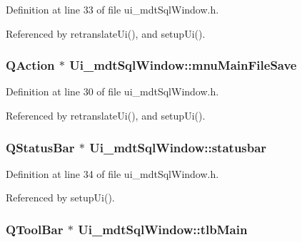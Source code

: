 Definition at line 33 of file ui\-\_\-mdt\-Sql\-Window.\-h.



Referenced by retranslate\-Ui(), and setup\-Ui().

\hypertarget{class_ui__mdt_sql_window_a58e6265c1ff8e257f024cd3dd1bf5e89}{
\subsubsection[{mnu\-Main\-File\-Save}]{\setlength{\rightskip}{0pt plus 5cm}Q\-Action $\ast$ Ui\-\_\-mdt\-Sql\-Window\-::mnu\-Main\-File\-Save}}\label{class_ui__mdt_sql_window_a58e6265c1ff8e257f024cd3dd1bf5e89}


Definition at line 30 of file ui\-\_\-mdt\-Sql\-Window.\-h.



Referenced by retranslate\-Ui(), and setup\-Ui().

\hypertarget{class_ui__mdt_sql_window_a48ad415bc7aa41b4d9a7386b6318ac7d}{
\subsubsection[{statusbar}]{\setlength{\rightskip}{0pt plus 5cm}Q\-Status\-Bar $\ast$ Ui\-\_\-mdt\-Sql\-Window\-::statusbar}}\label{class_ui__mdt_sql_window_a48ad415bc7aa41b4d9a7386b6318ac7d}


Definition at line 34 of file ui\-\_\-mdt\-Sql\-Window.\-h.



Referenced by setup\-Ui().

\hypertarget{class_ui__mdt_sql_window_a7c4b51eb698a2d510ad52e5f86500ec2}{
\subsubsection[{tlb\-Main}]{\setlength{\rightskip}{0pt plus 5cm}Q\-Tool\-Bar $\ast$ Ui\-\_\-mdt\-Sql\-Window\-::tlb\-Main}}\label{class_ui__mdt_sql_window_a7c4b51eb698a2d510ad52e5f86500ec2}


